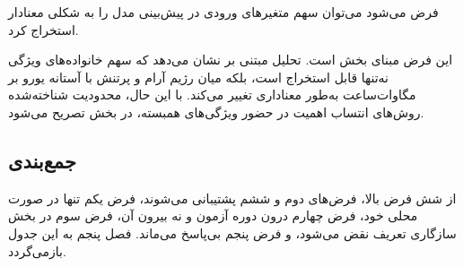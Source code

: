 فرض می‌شود می‌توان سهم متغیرهای ورودی در پیش‌بینی مدل را به شکلی معنادار
استخراج کرد.

این فرض مبنای بخش  است. تحلیل مبتنی بر  نشان می‌دهد که
سهم خانواده‌های ویژگی نه‌تنها قابل استخراج است، بلکه میان رژیم آرام و
پرتنش  با آستانه  یورو بر مگاوات‌ساعت  به‌طور
معناداری تغییر می‌کند. با این حال، محدودیت شناخته‌شده روش‌های انتساب
اهمیت در حضور ویژگی‌های همبسته، در بخش  تصریح می‌شود.

\subsection*{جمع‌بندی}

از شش فرض بالا، فرض‌های دوم و ششم پشتیبانی می‌شوند، فرض یکم تنها در صورت
محلی خود، فرض چهارم درون دوره آزمون و نه بیرون آن، فرض سوم در بخش
سازگاری تعریف نقض می‌شود، و فرض پنجم بی‌پاسخ می‌ماند. فصل پنجم به این
جدول بازمی‌گردد.
